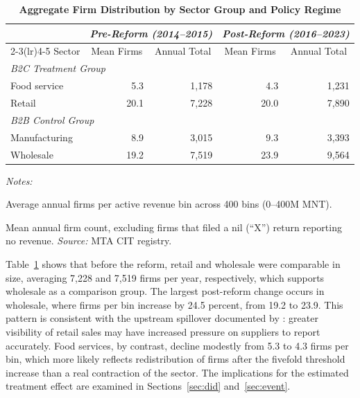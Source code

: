 \documentclass[12pt,oneside,a4paper]{report}
\begin{document}
\begin{table}[H]
\centering
\caption{\textbf{Aggregate Firm Distribution
         by Sector Group and Policy Regime}}
\label{tab:descriptive_stats}
\begin{threeparttable}
\setlength{\tabcolsep}{0pt}
\small
\begin{tabular*}{\linewidth}{l@{\extracolsep{\fill}}rrrr}
\toprule
& \multicolumn{2}{c}{\textit{Pre-Reform (2014--2015)}}
& \multicolumn{2}{c}{\textit{Post-Reform (2016--2023)}} \\
\cmidrule(lr){2-3}\cmidrule(lr){4-5}
Sector & \multicolumn{1}{c}{Mean Firms\tnote{a}}
& \multicolumn{1}{c}{Annual Total\tnote{b}}
& \multicolumn{1}{c}{Mean Firms\tnote{a}}
& \multicolumn{1}{c}{Annual Total\tnote{b}} \\
\midrule
\multicolumn{5}{l}{\textit{B2C Treatment Group}} \\[2pt]
\quad Food service         & 5.3 & 1,178 & 4.3 & 1,231 \\
\quad Retail               & 20.1 & 7,228 & 20.0 & 7,890 \\
[6pt]
\multicolumn{5}{l}{\textit{B2B Control Group}} \\[2pt]
\quad Manufacturing        & 8.9 & 3,015 & 9.3 & 3,393 \\
\quad Wholesale            & 19.2 & 7,519 & 23.9 & 9,564 \\
\bottomrule
\end{tabular*}
\begin{tablenotes}\footnotesize
\small\textit{Notes:}
\item[a] Average annual firms per active revenue bin across 400 bins (0--400M MNT).
\item[b] Mean annual firm count, excluding firms that filed a nil (``X'') return reporting no revenue.
\textit{Source:} MTA CIT registry.
\end{tablenotes}
\end{threeparttable}
\end{table}

Table~\ref{tab:descriptive_stats} shows that before the reform, retail and wholesale were comparable in size, averaging 7,228 and 7,519 firms per year, respectively, which supports wholesale as a comparison group. The largest post-reform change occurs in wholesale, where firms per bin increase by 24.5 percent, from 19.2 to 23.9. This pattern is consistent with the upstream spillover documented by \textcite{nyamdavaa2023does}: greater visibility of retail sales may have increased pressure on suppliers to report accurately. Food services, by contrast, decline modestly from 5.3 to 4.3 firms per bin, which more likely reflects redistribution of firms after the fivefold threshold increase than a real contraction of the sector. The implications for the estimated treatment effect are examined in Sections~\ref{sec:did} and~\ref{sec:event}.
\end{document}
